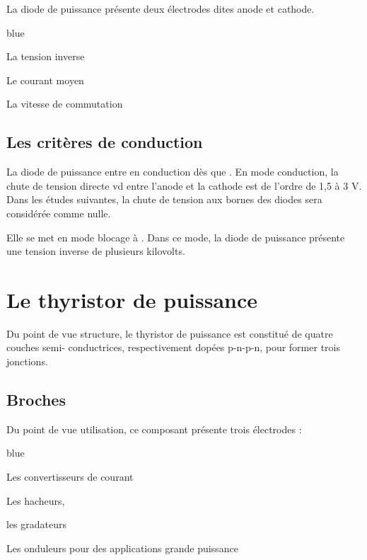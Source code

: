 La diode de puissance présente deux électrodes dites anode et cathode. 

\begin{items}{blue}{\Triangle}
  \item La tension inverse
  \item Le courant moyen
  \item La vitesse de commutation
\end{items}


\subsection{Les critères de conduction}

La diode de puissance entre en conduction dès que . En mode conduction, la chute de tension directe vd entre l’anode
et la cathode est de l’ordre de 1,5 à 3 V. \\
Dans les études suivantes, la chute de tension aux bornes des diodes sera considérée comme nulle.


Elle se met en mode blocage à . Dans ce mode, la diode de puissance présente une tension inverse de
plusieurs kilovolts.


\section{Le thyristor de puissance}

Du point de vue structure, le thyristor de puissance est constitué de quatre couches semi-
conductrices, respectivement dopées p-n-p-n, pour former trois jonctions.\\

\subsection{Broches}
Du point de vue utilisation, ce composant présente trois électrodes : 

\begin{items}{blue}{\Triangle}
    \item Les convertisseurs de courant
    \item Les hacheurs, 
    \item les gradateurs
    \item Les onduleurs pour des applications grande puissance
\end{items}

